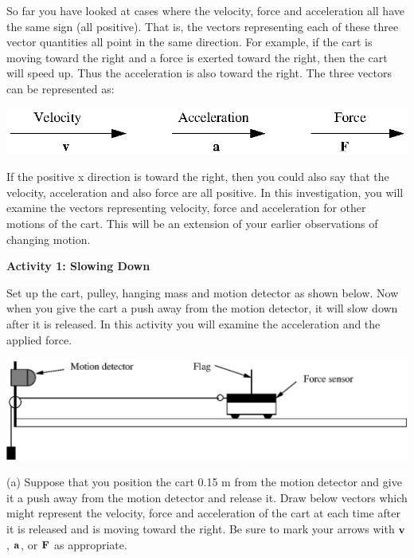 So far you have looked at cases where the velocity, force and acceleration all
have the same sign (all positive). That is, the vectors representing each of
these three vector quantities all point in the same direction. For example,
if the cart is moving toward the right and a force is exerted toward the right,
then the cart will speed up. Thus the acceleration is also toward the right.
The three vectors can be represented as:

\vspace{0.3cm}
{\par\centering \includegraphics{force2_fig1.eps} \par}
\vspace{0.3cm}

If the positive x direction is toward the right, then you could also say that
the velocity, acceleration and also force are all positive. In this investigation,
you will examine the vectors representing velocity, force and acceleration for
other motions of the cart. This will be an extension of your earlier observations
of changing motion.

\textbf{Activity 1: Slowing Down} 

Set up the cart, pulley, hanging mass and motion detector as shown below. Now
when you give the cart a push away from the motion detector, it will slow down
after it is released. In this activity you will examine the acceleration and
the applied force.

\vspace{0.3cm}
{\par\centering \includegraphics{force2_fig2.eps} \par}
\vspace{0.3cm}

(a) Suppose that you position the cart 0.15 m from the motion detector and give
it a push away from the motion detector and release it. Draw below vectors which
might represent the velocity, force and acceleration of the cart at each time
after it is released and is moving toward the right. Be sure to mark your arrows
with \( {\bf v} \), \( {\bf a} \), or \( {\bf F} \)
as appropriate.

